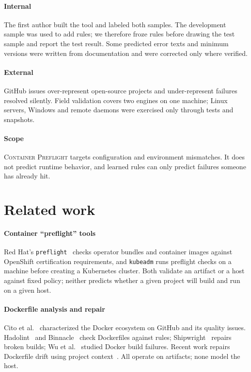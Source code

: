 \documentclass[preprint,12pt]{elsarticle}
\newcommand{\tool}{\textsc{Container Preflight}}
\begin{document}
\paragraph{Internal} The first author built the tool and labeled both samples. The development sample was used to add rules; we therefore froze rules before drawing the test sample and report the test result. Some predicted error texts and minimum versions were written from documentation and were corrected only where verified.

\paragraph{External} GitHub issues over-represent open-source projects and under-represent failures resolved silently. Field validation covers two engines on one machine; Linux servers, Windows and remote daemons were exercised only through tests and snapshots.

\paragraph{Scope} \tool{} targets configuration and environment mismatches. It does not predict runtime behavior, and learned rules can only predict failures someone has already hit.

\section{Related work}
\label{sec:related}

\paragraph{Container ``preflight'' tools} Red Hat's \texttt{preflight}~\cite{openshiftpreflight} checks operator bundles and container images against OpenShift certification requirements, and \texttt{kubeadm} runs preflight checks on a machine before creating a Kubernetes cluster. Both validate an artifact or a host against fixed policy; neither predicts whether a given project will build and run on a given host.

\paragraph{Dockerfile analysis and repair} Cito et al.~\cite{cito2017docker} characterized the Docker ecosystem on GitHub and its quality issues. Hadolint~\cite{hadolint} and Binnacle~\cite{henkel2020binnacle} check Dockerfiles against rules; Shipwright~\cite{henkel2021shipwright} repairs broken builds; Wu et al.~\cite{wu2020buildfailures} studied Docker build failures. Recent work repairs Dockerfile drift using project context~\cite{drift2026}. All operate on artifacts; none model the host.
\end{document}
